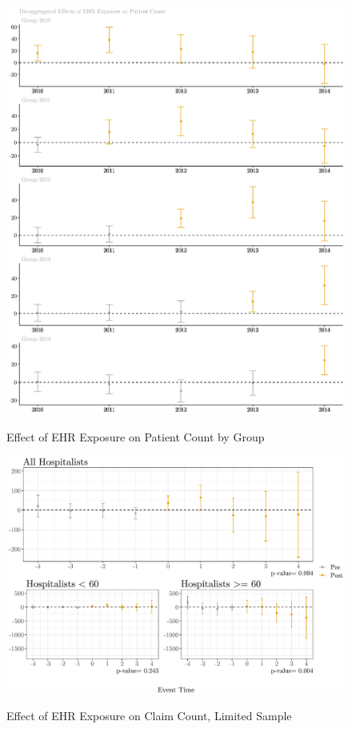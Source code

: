 \documentclass[11pt]{article}
\begin{document}
\begin{figure}[p]
    \centering
    \caption{Effect of EHR Exposure on Patient Count by Group}
    \includegraphics[scale=.35]{Objects/patient_group.pdf}
    \label{fig:patientgroup}
\end{figure}

\begin{figure}[p]
    \centering
    \caption{Effect of EHR Exposure on Claim Count, Limited Sample}
    \includegraphics[scale=.65]{Objects/claim_plot.pdf}
    \label{fig:claim}
\end{figure}
\end{document}
